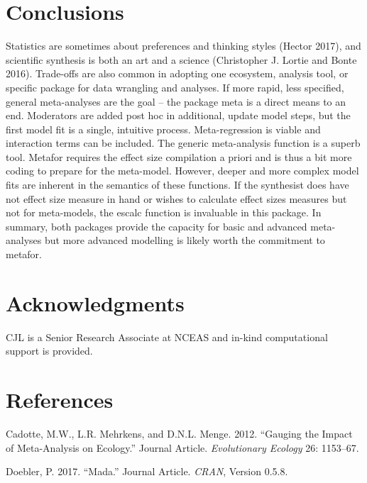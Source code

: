 \documentclass[fleqn,10pt]{wlpeerj} %
\begin{document}
\section*{Conclusions}\label{conclusions}

Statistics are sometimes about preferences and thinking styles (Hector
2017), and scientific synthesis is both an art and a science
(Christopher J. Lortie and Bonte 2016). Trade-offs are also common in
adopting one ecosystem, analysis tool, or specific package for data
wrangling and analyses. If more rapid, less specified, general
meta-analyses are the goal -- the package meta is a direct means to an
end. Moderators are added post hoc in additional, update model steps,
but the first model fit is a single, intuitive process. Meta-regression
is viable and interaction terms can be included. The generic
meta-analysis function is a superb tool. Metafor requires the effect
size compilation a priori and is thus a bit more coding to prepare for
the meta-model. However, deeper and more complex model fits are inherent
in the semantics of these functions. If the synthesist does have not
effect size measure in hand or wishes to calculate effect sizes measures
but not for meta-models, the escalc function is invaluable in this
package. In summary, both packages provide the capacity for basic and
advanced meta-analyses but more advanced modelling is likely worth the
commitment to metafor.

\section*{Acknowledgments}\label{acknowledgments}

CJL is a Senior Research Associate at NCEAS and in-kind computational
support is provided.

\section*{References}\label{references}

\hypertarget{refs}{}
\hypertarget{ref-RN2189}{}
Cadotte, M.W., L.R. Mehrkens, and D.N.L. Menge. 2012. ``Gauging the
Impact of Meta-Analysis on Ecology.'' Journal Article.
\emph{Evolutionary Ecology} 26: 1153--67.

\hypertarget{ref-RN6196}{}
Doebler, P. 2017. ``Mada.'' Journal Article. \emph{CRAN}, Version 0.5.8.
\end{document}
